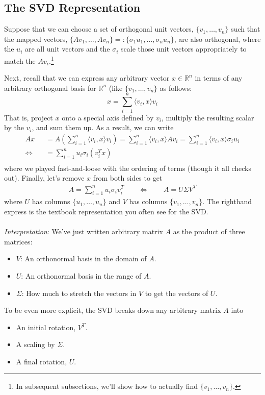 \documentclass[12pt]{article}
\begin{document}
\subsection{The SVD Representation}

Suppose that we can choose a set of orthogonal unit
vectors, $\{v_1,\ldots,v_n\}$ such that the mapped vectors,
$\{Av_1,\ldots,Av_n\}=:\{\sigma_1 u_1, \ldots, \sigma_n u_n\}$, are also
orthogonal, where the $u_i$ are all unit vectors and the $\sigma_i$
scale those unit vectors appropriately to match the $Av_i$.\footnote{In
subsequent subsections, we'll show how to actually find
$\{v_1,\ldots,v_n\}$.}

Next, recall that we can express any arbitrary vector $x\in\mathbb{R}^n$
in terms of any arbitrary orthogonal basis for $\mathbb{R}^n$ (like
$\{v_1,\ldots,v_n\}$ as follows:
\[
  x = \sum^n_{i=1} \langle v_i, x\rangle v_i
\]
That is, project $x$ onto a special axis defined by $v_i$, multiply the
resulting scalar by the $v_i$, and sum them up. As a result, we can
write 
\begin{align*}
  Ax &= A\left(\sum^n_{i=1} \langle v_i, x\rangle v_i\right)
  = \sum^n_{i=1} \langle v_i, x\rangle A v_i
  = \sum^n_{i=1} \langle v_i, x\rangle \sigma_i u_i\\
  \Leftrightarrow \quad &= \sum^n_{i=1} u_i \sigma_i (v_i^T x)\\
\end{align*}
where we played fast-and-loose with the ordering of terms (though it all
checks out). Finally, let's remove $x$ from both sides to get
\begin{align*}
  A = \sum^n_{i=1} u_i \sigma_i v_i^T 
  \qquad \Leftrightarrow \qquad
  A = U \Sigma V^T
\end{align*}
where $U$ has columns $\{u_1,\ldots,u_n\}$ and $V$ has columns
$\{v_1,\ldots,v_n\}$. The righthand express is the textbook
representation you often see for the SVD.
\\
\\
{\sl Interpretation}: We've just written arbitrary matrix $A$ as the
product of three matrices:
\begin{itemize}
  \item $V$: An orthonormal basis in the domain of $A$.
  \item $U$: An orthonormal basis in the range of $A$.
  \item $\Sigma$: How much to stretch the vectors in $V$ to get the
    vectors of $U$.
\end{itemize}
To be even more explicit, the SVD breaks down any arbitrary matrix $A$
into
\begin{itemize}
  \item An initial rotation, $V^T$.
  \item A scaling by $\Sigma$.
  \item A final rotation, $U$.
\end{itemize}
\end{document}
